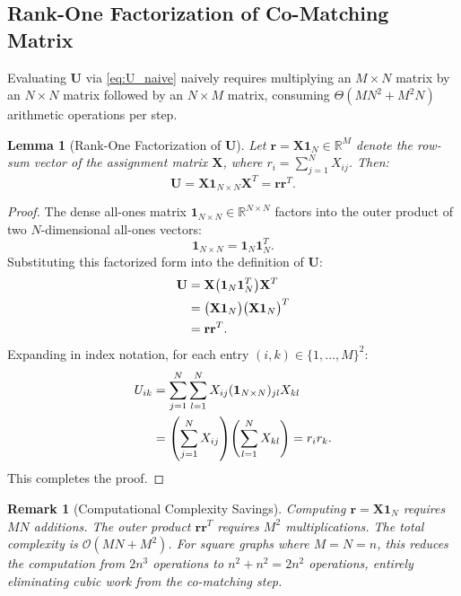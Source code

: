 \documentclass[conference]{IEEEtran}
\newtheorem{lemma}{Lemma}
\newtheorem{remark}{Remark}
\begin{document}
\subsection{Rank-One Factorization of Co-Matching Matrix}

Evaluating $\mathbf{U}$ via \eqref{eq:U_naive} naively requires multiplying an $M \times N$ matrix by an $N \times N$ matrix followed by an $N \times M$ matrix, consuming $\Theta(MN^2 + M^2N)$ arithmetic operations per step.

\begin{lemma}[Rank-One Factorization of $\mathbf{U}$]
\label{lem:rank1}
Let $\mathbf{r} = \mathbf{X}\mathbf{1}_N \in \mathbb{R}^M$ denote the row-sum vector of the assignment matrix $\mathbf{X}$, where $r_i = \sum_{j=1}^N X_{ij}$. Then:
\begin{equation}
\mathbf{U} = \mathbf{X}\mathbf{1}_{N\times N}\mathbf{X}^T = \mathbf{r}\mathbf{r}^T.
\label{eq:lemma1_result}
\end{equation}
\end{lemma}

\begin{proof}
The dense all-ones matrix $\mathbf{1}_{N\times N} \in \mathbb{R}^{N\times N}$ factors into the outer product of two $N$-dimensional all-ones vectors:
\begin{equation}
\mathbf{1}_{N\times N} = \mathbf{1}_N \mathbf{1}_N^T.
\end{equation}
Substituting this factorized form into the definition of $\mathbf{U}$:
\begin{align}
\mathbf{U} &= \mathbf{X} \big(\mathbf{1}_N \mathbf{1}_N^T\big) \mathbf{X}^T \notag\\
&= \big(\mathbf{X}\mathbf{1}_N\big) \big(\mathbf{X}\mathbf{1}_N\big)^T \notag\\
&= \mathbf{r} \mathbf{r}^T.
\end{align}
Expanding in index notation, for each entry $(i, k) \in \{1, \ldots, M\}^2$:
\begin{align}
U_{ik} &= \sum_{j=1}^N \sum_{l=1}^N X_{ij} (\mathbf{1}_{N\times N})_{jl} X_{kl} \notag\\
&= \left(\sum_{j=1}^N X_{ij}\right)\!\left(\sum_{l=1}^N X_{kl}\right) = r_i r_k.
\end{align}
This completes the proof.
\end{proof}

\begin{remark}[Computational Complexity Savings]
Computing $\mathbf{r} = \mathbf{X}\mathbf{1}_N$ requires $MN$ additions. The outer product $\mathbf{r}\mathbf{r}^T$ requires $M^2$ multiplications. The total complexity is $\mathcal{O}(MN + M^2)$. For square graphs where $M = N = n$, this reduces the computation from $2n^3$ operations to $n^2 + n^2 = 2n^2$ operations, entirely eliminating cubic work from the co-matching step.
\end{remark}
\end{document}
